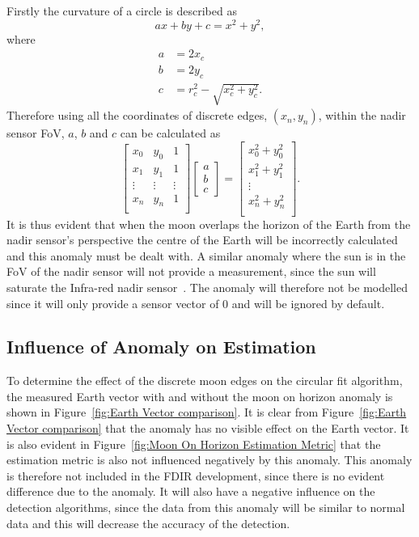 Firstly the curvature of a circle is described as 
\begin{equation}
	ax + by + c = x^2 + y^2,
\end{equation}
where 
\begin{equation}
	\begin{aligned}
		a &= 2x_c \\
		b &= 2y_c \\
		c &= r_c^2-\sqrt{x_c^2 + y_c^2}.
	\end{aligned}
\end{equation}
Therefore using all the coordinates of discrete edges, $(x_n, y_n)$, within the nadir sensor FoV, $a$, $b$ and $c$ can be calculated as
\begin{equation}
	\begin{bmatrix}
		x_0 & y_0 & 1\\
		x_1 & y_1 & 1\\
		\vdots & \vdots & \vdots\\
		x_n & y_n & 1\\
	\end{bmatrix}	\begin{bmatrix}
	a\\
	b\\
	c
\end{bmatrix} = \begin{bmatrix}
		x_0^2 + y_0^2\\
		x_1^2 + y_1^2\\
		\vdots \\
		x_n^2 + y_n^2\\
	\end{bmatrix}.
\end{equation}
It is thus evident that when the moon overlaps the horizon of the Earth from the nadir sensor's perspective the centre of the Earth will be incorrectly calculated and this anomaly must be dealt with. A similar anomaly where the sun is in the FoV of the nadir sensor will not provide a measurement, since the sun will saturate the Infra-red nadir sensor~\cite{wessels2018infrared}. The anomaly will therefore not be modelled since it will only provide a sensor vector of $0$ and will be ignored by default.

\subsection{Influence of Anomaly on Estimation}
To determine the effect of the discrete moon edges on the circular fit algorithm, the measured Earth vector with and without the moon on horizon anomaly is shown in Figure~\ref{fig:Earth Vector comparison}. It is clear from Figure~\ref{fig:Earth Vector comparison} that the anomaly has no visible effect on the Earth vector. It is also evident in Figure~\ref{fig:Moon On Horizon Estimation Metric} that the estimation metric is also not influenced negatively by this anomaly. This anomaly is therefore not included in the FDIR development, since there is no evident difference due to the anomaly. It will also have a negative influence on the detection algorithms, since the data from this anomaly will be similar to normal data and this will decrease the accuracy of the detection.

